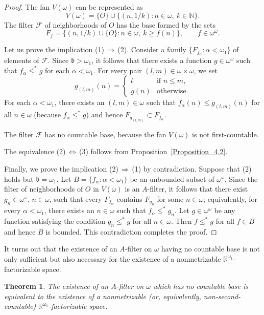 \documentclass[a4paper,12pt]{amsart}
\newtheorem{theorem}{Theorem}[section]
\theoremstyle{definition}
\theoremstyle{remark}
\begin{document}
\begin{proof}
The fan $V(\omega)$ can be represented as 
$$
V(\omega)=\{O\}\cup \{(n, 1/k): n\in \omega,\ k\in \mathbb N\}.
$$
The filter $\mathscr F$ of neighborhoods of $O$ has the base formed by the sets 
$$
F_f=\{(n, 1/k)\cup\{O\}: n\in \omega,\ k\ge f(n)\},\qquad f\in \omega^\omega. 
$$

Let us prove the implication (1)\,$\Rightarrow$\,(2).
Consider a family $\{F_{f_\alpha}: \alpha <\omega_1\}$ of elements of $\mathscr F$. 
Since $\mathfrak b>\omega_1$, it follows that there exists a function $g\in 
\omega^\omega$ such that $f_\alpha \le^* g$ for each $\alpha<\omega_1$. For every pair $(l,m)\in \omega\times 
\omega$, we set 
$$
g_{(l,m)}(n)=
\begin{cases}
l&\text{if $n\le m$},\\
g(n)&\text{otherwise}.
\end{cases}
$$  
For each $\alpha<\omega_1$, there exists an $(l,m)\in \omega$ such that $f_\alpha(n)\le g_{(l,m)}(n)$ for 
all $n\in \omega$ (because $f_\alpha\le^* g$) and hence $F_{g_{(l,m)}}\subset F_{f_\alpha}$. 

The filter $\mathscr F$ has no countable base, because the fan $V(\omega)$ is not first-countable.

The equivalence (2)\,$\Leftrightarrow$\,(3) follows from Proposition~\ref{Proposition_4.2}. 

Finally, we prove the implication (2)\,$\Rightarrow$\,(1) by contradiction. Suppose that (2) holds  but $\mathfrak 
b=\omega_1$. Let $B=\{f_\alpha: \alpha<\omega_1\}$ be an unbounded subset of $\omega^\omega$. Since the filter of 
neighborhoods of $O$ in $V(\omega)$ is an $A$-filter, it follows that there exist $g_n\in \omega^\omega$, $n\in 
\omega$, such that every $F_{f_\alpha}$ contains $F_{g_n}$ for some $n\in \omega$; equivalently, for 
every $\alpha<\omega_1$, there exists an $n\in \omega$ such that $f_\alpha\leq^* g_n$. Let 
$g\in\omega^\omega$ be any function satisfying the condition $g_n\leq^* g$ for all $n\in\omega$. Then $f 
\leq^* g$ for all $f\in B$ and hence $B$ is bounded. This contradiction completes the proof. 
\end{proof}

It turns out that the existence of an $A$-filter on $\omega$ having no countable base is not only sufficient but 
also necessary for the existence of a nonmetrizable $\mathbb R^{\omega_1}$-factorizable space. 

\begin{theorem}
\label{Theorem_4.2}
The existence of an $A$-filter on $\omega$ which has no countable base is equivalent to the existence 
of a nonmetrizable (or, equivalently, non-second-countable) $\mathbb R^{\omega_1}$-factorizable space. 
\end{theorem}
\end{document}
